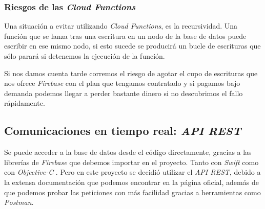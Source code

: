 \subsubsection{Riesgos de las \textit{Cloud Functions}}
Una situación a evitar utilizando \textit{Cloud Functions}, es la recursividad. Una función que se lanza tras una escritura en un nodo de la base de datos puede escribir en ese mismo nodo, si esto sucede se producirá un bucle de escrituras que sólo parará si detenemos la ejecución de la función.

Si nos damos cuenta tarde corremos el riesgo de agotar el cupo de escrituras que nos ofrece \textit{Firebase} con el plan que tengamos contratado y si pagamos bajo demanda podemos llegar a perder bastante dinero si no descubrimos el fallo rápidamente.

\subsection{Comunicaciones en tiempo real: \textit{API REST}}
Se puede acceder a la base de datos desde el código directamente, gracias a las librerías de \textit{Firebase} que debemos importar en el proyecto. Tanto con \textit{Swift} \cite{firebase_firebasedatabase_2018} como con \textit{Objective-C} \cite{firebase_firebasedatabase_2018-1}. Pero en este proyecto se decidió utilizar el \textit{API REST}, debido a la extensa documentación \cite{firebase_firebase_2018} que podemos encontrar en la página oficial, además de que podemos probar las peticiones con más facilidad gracias a herramientas como \textit{Postman}.

